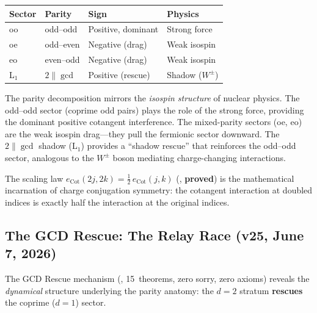 \begin{center}
\small
\begin{tabular}{@{}llll@{}}
\toprule
\textbf{Sector} & \textbf{Parity} & \textbf{Sign} & \textbf{Physics} \\
\midrule
oo & odd--odd   & Positive, dominant & Strong force \\
oe & odd--even  & Negative (drag)    & Weak isospin \\
eo & even--odd  & Negative (drag)    & Weak isospin \\
L$_1$ & $2 \| \gcd$ & Positive (rescue)  & Shadow ($W^\pm$) \\
\bottomrule
\end{tabular}
\end{center}

\begin{correspondence}
The parity decomposition mirrors the \emph{isospin structure} of
nuclear physics. The odd--odd sector (coprime odd pairs) plays the
role of the strong force, providing the dominant positive cotangent
interference. The mixed-parity sectors (oe, eo) are the weak isospin
drag---they pull the fermionic sector downward. The $2 \| \gcd$
shadow (L$_1$) provides a ``shadow rescue'' that reinforces the
odd--odd sector, analogous to the $W^\pm$ boson mediating
charge-changing interactions.

The scaling law $e_{\mathrm{Cot}}(2j, 2k) = \tfrac{1}{2}\, e_{\mathrm{Cot}}(j,k)$
(, \textbf{proved}) is the mathematical
incarnation of charge conjugation symmetry: the cotangent interaction
at doubled indices is exactly half the interaction at the original
indices.
\end{correspondence}

\subsection{The GCD Rescue: The Relay Race (v25, June 7, 2026)}
\label{sec:gcd-rescue}

The GCD Rescue mechanism (, 15~theorems,
zero sorry, zero axioms) reveals the {\em dynamical} structure
underlying the parity anatomy: the $d = 2$ stratum
\textbf{rescues} the coprime ($d = 1$) sector.

